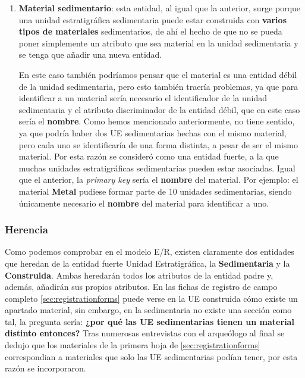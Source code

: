 \begin{enumerate}
        \item \textbf{Material sedimentario}: esta entidad, al igual que la anterior, surge
        porque una unidad estratigráfica sedimentaria puede estar construida con 
        \textbf{varios tipos de materiales} sedimentarios, de ahí el hecho de que no se pueda
        poner simplemente un atributo que sea material en la unidad sedimentaria y se tenga que
        añadir una nueva entidad.

        En este caso también podríamos pensar que el material es una entidad débil de la unidad
        sedimentaria, pero esto también traería problemas, ya que para identificar a un material
        sería necesario el identificador de la unidad sedimentaria y el atributo discriminador
        de la entidad débil, que en este caso sería el \textbf{nombre}. Como hemos mencionado
        anteriormente, no tiene sentido, ya que podría haber dos UE sedimentarias hechas
        con el mismo material, pero cada uno se identificaría de una forma distinta, a pesar
        de ser el mismo material. Por esta razón se consideró como una entidad fuerte, a la
        que muchas unidades estratigráficas sedimentarias pueden estar asociadas. Igual que el
        anterior, la \textit{primary key} sería el \textbf{nombre} del material. Por ejemplo: el
        material \textbf{Metal} pudiese formar parte de 10 unidades sedimentarias, siendo
        únicamente necesario el \textbf{nombre} del material para identificar a uno. 
    \end{enumerate}

    \subsubsection{Herencia}
    Como podemos comprobar en el modelo E/R, existen claramente dos entidades que heredan de
    la entidad fuerte Unidad Estratigráfica, la \textbf{Sedimentaria} y la \textbf{Construida}.
    Ambas heredarán todos los atributos de la entidad padre y, además, añadirán sus propios
    atributos. En las fichas de registro de campo completo \ref{sec:registrationforms} puede
    verse en la UE construida cómo existe un apartado material, sin embargo, en la sedimentaria
    no existe una sección como tal, la pregunta sería: \textbf{¿por qué las UE sedimentarias
    tienen un material distinto entonces?} Tras numerosas entrevistas con el arqueólogo al
    final se dedujo que los materiales de la primera hoja de \ref{sec:registrationforms}
    correspondian a materiales que solo las UE sedimentarias podían tener, por esta razón
    se incorporaron.

